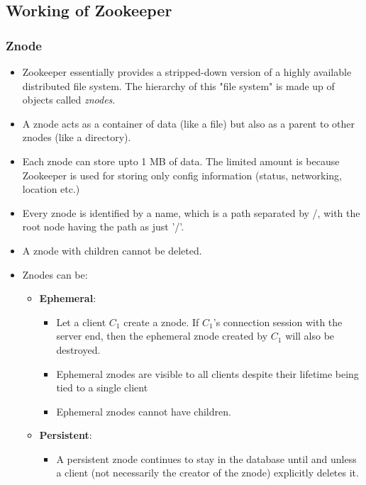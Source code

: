 \documentclass{article}
\begin{document}
\subsection{Working of Zookeeper}
\subsubsection{Znode}
\begin{itemize}
    \item Zookeeper essentially provides a stripped-down version of a highly available distributed file system. The hierarchy of this "file system" is made up of objects called \textit{znodes}.
    
    \item A znode acts as a container of data (like a file) but also as a parent to other znodes (like a directory). 
    
    \item Each znode can store upto 1 MB of data. The limited amount is because Zookeeper is used for storing only config information (status, networking, location etc.)
    
    \item Every znode is identified by a name, which is a path separated by /, with the root node having the path as just '/'. 
    
    \item A znode with children cannot be deleted. 
    
    \item Znodes can be:
    \begin{itemize}
        \item \textbf{Ephemeral}: 
        \begin{itemize}
            \item Let a client $C_1$ create a znode. If $C_1$'s connection session with the server end, then the ephemeral znode created by $C_1$ will also be destroyed.
            
            \item Ephemeral znodes are visible to all clients despite their lifetime being tied to a single client
            
            \item Ephemeral znodes cannot have children.
        \end{itemize} 
        
        \item \textbf{Persistent}: 
        \begin{itemize}
            \item A persistent znode continues to stay in the database until and unless a client (not necessarily the creator of the znode) explicitly deletes it. 
        \end{itemize}
        

\end{itemize}
\end{itemize}
\end{document}
